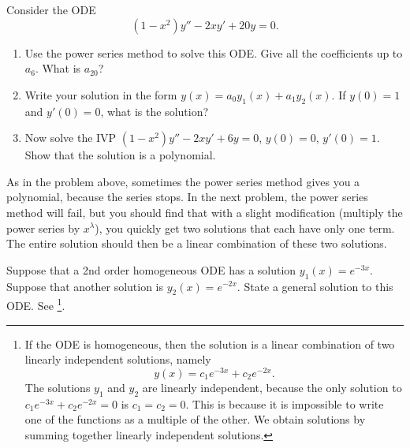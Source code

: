 \begin{problem}
 Consider the ODE $$(1-x^2)y'' - 2xy'+20y=0.$$
\begin{enumerate}
 \item Use the power series method to solve this ODE. Give all the coefficients up to $a_6$.  What is $a_{20}$? 
 \item Write your solution in the form $y(x) = a_0y_1(x)+a_1y_2(x)$. If $y(0)=1$ and $y'(0)=0$, what is the solution?
 \item Now solve the IVP $(1-x^2)y'' - 2xy'+6y=0$, $y(0)=0$, $y'(0)=1$.  Show that the solution is a polynomial. 
\end{enumerate}
 
\end{problem}

As in the problem above, sometimes the power series method gives you a polynomial, because the series stops. In the next problem, the power series method will fail, but you should find that with a slight modification (multiply the power series by $x^\lambda$), you quickly get two solutions that each have only one term. The entire solution should then be a linear combination of these two solutions.

\begin{review*}
 Suppose that a 2nd order homogeneous ODE has a solution $y_1(x) = e^{-3x}$.  Suppose that another solution is $y_2(x) = e^{-2x}$. State a general solution to this ODE. See \footnote{
If the ODE is homogeneous, then the solution is a linear combination of two linearly independent solutions, namely 
$$y(x) =c_1e^{-3x}+c_2e^{-2x}.$$ 
The solutions $y_1$ and $y_2$ are linearly independent, because the only solution to $c_1 e^{-3x}+c_2e^{-2x}=0$ is $c_1=c_2=0$.  This is because it is impossible to write one of the functions as a multiple of the other.
We obtain solutions by summing together linearly independent solutions.
}. 
\end{review*}


